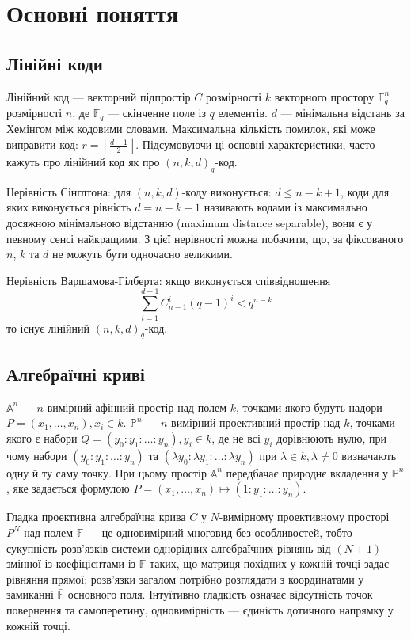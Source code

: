 \documentclass[a4paper,12pt,oneside]{article}
\begin{document}
\section{Основні поняття}

\subsection{Лінійні коди}
Лінійний код --- векторний підпростір $C$ розмірності $k$ векторного простору $\mathbb{F}_q^n$ розмірності $n$, де $\mathbb{F}_q$ --- скінченне поле із $q$ елементів. 
$d$ --- мінімальна відстань за Хемінгом між кодовими словами. Максимальна кількість помилок, які може виправити код: $r=\left \lfloor \frac{d-1}{2} \right \rfloor$. 
Підсумовуючи ці основні характеристики, часто кажуть про лінійний код як про $(n, k, d)_q$-код.

Нерівність Сінглтона: для $(n, k, d)$-коду виконується: $d \le n-k+1$, 
коди для яких виконується рівність $d = n-k+1$ називають кодами із максимально досяжною мінімальною відстанню (maximum distance separable), вони є у певному сенсі найкращими. 
З цієї нерівності можна побачити, що, за фіксованого $n$, $k$ та $d$ не можуть бути одночасно великими.

Нерівність Варшамова-Гілберта: якщо виконується співвідношення 
$$\sum_{i=1}^{d-1} C_{n-1}^i (q-1)^i < q^{n-k}$$
то існує лінійний $(n, k ,d)_q$-код.


\subsection{Алгебраїчні криві}
$\mathbb{A}^n$ --- $n$-вимірний афінний простір над полем $k$, точками якого будуть надори $P = (x_1, \dots, x_n), x_i \in k$. 
$\mathbb{P}^n$ --- $n$-вимірний проективний простір над $k$, точками якого є набори $Q=(y_0 : y_1 : \ldots : y_n), y_i \in k$, де не всі $y_i$ дорівнюють нулю,
при чому набори $(y_0 : y_1 : \ldots : y_n)$ та $(\lambda y_0 : \lambda y_1 : \ldots : \lambda y_n)$ при $\lambda \in k, \lambda \neq 0$ визначають одну й ту саму точку. 
При цьому простір $\mathbb{A}^n$ передбачає природнє вкладення у $\mathbb{P}^n$, яке задається формулою $P = (x_1, \dots, x_n) \mapsto (1: y_1 : \ldots : y_n)$.

Гладка проективна алгебраїчна крива $C$ у $N$-вимірному проективному просторі $P^N$ над полем $\mathbb{F}$ --- 
це одновимірний многовид без особливостей, тобто сукупність розв'язків системи однорідних алгебраїчних рівнянь від
$(N+1)$ змінної із коефіцієнтами із $\mathbb{F}$ таких, що матриця похідних у кожній точці задає рівняння прямої; 
розв'язки загалом потрібно розглядати з координатами у замиканні $\bar{\mathbb{F}}$ основного поля.
Інтуїтивно гладкість означає відсутність точок повернення та самоперетину, одновимірність --- єдиність 
дотичного напрямку у кожній точці.
\end{document}
